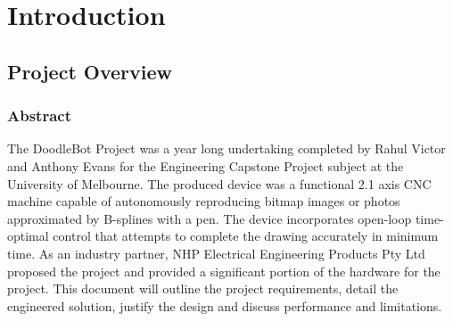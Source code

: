 
\chapter{Introduction}





\section{Project Overview}

\subsection{Abstract}
The DoodleBot Project was a year long undertaking completed by Rahul Victor and Anthony Evans for the  Engineering Capstone Project subject at the University of Melbourne. The produced device was a functional 2.1 axis CNC machine capable of autonomously reproducing bitmap images or photos approximated by B-splines with a pen. The device incorporates open-loop time-optimal control that attempts to complete the drawing accurately in minimum time. As an industry partner, NHP Electrical Engineering Products Pty Ltd proposed the project and provided a significant portion of the hardware for the project. This document will outline the project requirements, detail the engineered solution, justify the design and discuss performance and limitations. 

